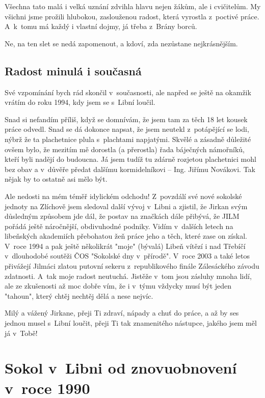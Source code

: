 \documentclass[a5paper, 11pt, twoside]{article}
\begin{document}
Všechna tato malá i velká uznání zdvihla hlavu nejen žákům, ale i
cvičitelům. My všichni jsme prožili hlubokou, zaslouženou radost, která
vyrostla z~poctivé práce. A~k~tomu má každý i vlastní dojmy, já třeba
z~Brány borců.

Ne, na ten slet se nedá zapomenout, a kdoví, zda nezůstane
nejkrásnějším.

\vspace{\fill}

\subsection{Radost minulá i současná}

Své vzpomínání bych rád skončil v~současnosti, ale napřed se ještě na
okamžik vrátím do roku 1994, kdy jsem se s~Libní loučil.

Snad si nefandím příliš, když se domnívám, že jsem tam za těch 18 let
kousek práce odvedl. Snad se dá dokonce napsat, že jsem neutekl
z~potápějící se lodi, nýbrž že ta plachetnice plula s~plachtami napjatými.
Skvělé a zásadně důležité ovšem bylo, že mezitím mě dorostla (a
přerostla) řada báječných námořníků, kteří byli nadějí do budoucna. Já
jsem tudíž tu zdárně rozjetou plachetnici mohl bez obav a v~důvěře
předat dalšímu kormidelníkovi -- Ing. Jiřímu Novákovi. Tak nějak by to
ostatně asi mělo být.

Ale nedosti na mém téměř idylickém odchodu! Z~povzdálí své nové sokolské
jednoty na Zlíchově jsem sledoval další vývoj v~Libni a zjistil, že
Jirkan svým důsledným způsobem jde dál, že postav na značkách dále
přibývá, že JILM pořádá ještě náročnější, obdivuhodné podniky. Vidím
v~dalších letech na libeňských akademiích přebohatou žeň práce jeho a
těch, které zase on získal. V~roce 1994 a pak ještě několikrát "moje"
(bývalá) Libeň vítězí i nad Třebíčí v~dlouhodobé soutěži ČOS "Sokolské
dny v~přírodě". V~roce 2003 a také letos přivážejí Jilmáci zlatou
putovní sekeru z~republikového finále Zálesáckého závodu zdatnosti.
A~tak moje radost neutuchá. Jistěže v~tom jsou zásluhy mnoha lidí, ale ze
zkušenosti až moc dobře vím, že i v~týmu vždycky musí být jeden
"tahoun", který chtěj nechtěj dělá a nese nejvíc.

Milý a vážený Jirkane, přeji Ti zdraví, nápady a chuť do práce, a až by
ses jednou musel s~Libní loučit, přeji Ti tak znamenitého nástupce,
jakého jsem měl já v~Tobě!

\section{Sokol v~Libni od znovuobnovení v~roce 1990}
\end{document}
